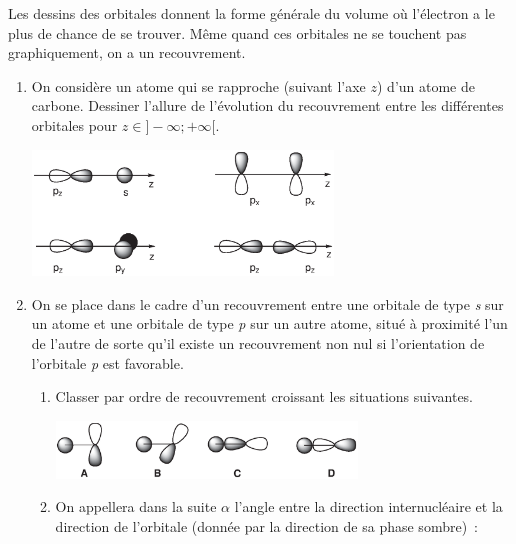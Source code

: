 
Les dessins des orbitales donnent la forme g\'en\'erale du volume o\`u l'\'electron
a le plus de chance de se trouver. M\^eme quand ces orbitales ne se touchent pas
graphiquement, on a un recouvrement.

\begin{enumerate}
\item On consid\`ere un atome qui se rapproche (suivant l'axe $z$) d'un atome de carbone.
Dessiner l'allure de l'\'evolution du recouvrement entre les diff\'erentes orbitales
pour $z \in ]-\infty;+\infty[$.

\vspace{-0.3cm}
\begin{center}
\includegraphics[width=8.0cm]{figure/overl1.eps}
\end{center}

\item On se place dans le cadre d'un recouvrement entre une orbitale de type \textit{s}
sur un atome et une orbitale de type \textit{p} sur un autre atome, situ\'e \`a proximit\'e
l'un de l'autre de sorte qu'il existe un recouvrement non nul si l'orientation de l'orbitale
\textit{p} est favorable.

\begin{enumerate}
\item Classer par ordre de recouvrement croissant les situations suivantes.
\vspace{-0.3cm}
\begin{center}
\includegraphics[width=8.0cm]{figure/overlangle.eps}
\end{center}

\item On appellera dans la suite $\alpha$ l'angle entre la direction internucl\'eaire et la
direction de l'orbitale (donn\'ee par la direction de sa phase sombre)~:


\end{enumerate}
\end{enumerate}

